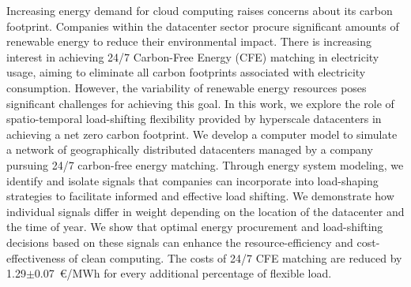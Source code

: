 %

Increasing energy demand for cloud computing raises concerns about its carbon footprint. Companies within the datacenter sector procure significant amounts of renewable energy to reduce their environmental impact. There is increasing interest in achieving 24/7 Carbon-Free Energy (CFE) matching in electricity usage, aiming to eliminate all carbon footprints associated with electricity consumption. However, the variability of renewable energy resources poses significant challenges for achieving this goal. In this work, we explore the role of spatio-temporal load-shifting flexibility provided by hyperscale datacenters in achieving a net zero carbon footprint. We develop a computer model to simulate a network of geographically distributed datacenters managed by a company pursuing 24/7 carbon-free energy matching. Through energy system modeling, we identify and isolate signals that companies can incorporate into load-shaping strategies to facilitate informed and effective load shifting. We demonstrate how individual signals differ in weight depending on the location of the datacenter and the time of year. We show that optimal energy procurement and load-shifting decisions based on these signals can enhance the resource-efficiency and cost-effectiveness of clean computing. The costs of 24/7 CFE matching are reduced by 1.29$\pm$0.07~\euro/MWh for every additional percentage of flexible load.